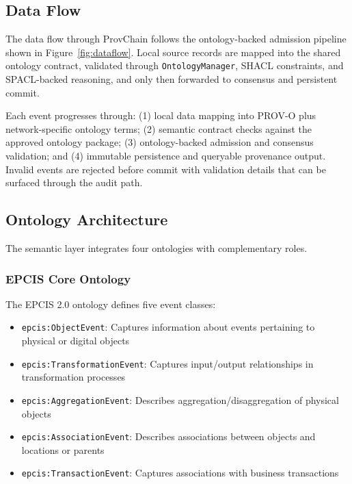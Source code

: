 \documentclass[preprint,review,12pt,authoryear]{elsarticle}
\begin{document}


\subsection{Data Flow}

The data flow through ProvChain follows the ontology-backed admission pipeline shown in Figure~\ref{fig:dataflow}. Local source records are mapped into the shared ontology contract, validated through \texttt{OntologyManager}, SHACL constraints, and SPACL-backed reasoning, and only then forwarded to consensus and persistent commit.

Each event progresses through: (1) local data mapping into PROV-O plus network-specific ontology terms; (2) semantic contract checks against the approved ontology package; (3) ontology-backed admission and consensus validation; and (4) immutable persistence and queryable provenance output. Invalid events are rejected before commit with validation details that can be surfaced through the audit path.

\subsection{Ontology Architecture}

The semantic layer integrates four ontologies with complementary roles.

\subsubsection{EPCIS Core Ontology}

The EPCIS 2.0 ontology defines five event classes:

\begin{itemize}
    \item \texttt{epcis:ObjectEvent}: Captures information about events pertaining to physical or digital objects
    \item \texttt{epcis:TransformationEvent}: Captures input/output relationships in transformation processes
    \item \texttt{epcis:AggregationEvent}: Describes aggregation/disaggregation of physical objects
    \item \texttt{epcis:AssociationEvent}: Describes associations between objects and locations or parents
    \item \texttt{epcis:TransactionEvent}: Captures associations with business transactions
\end{itemize}
\end{document}
